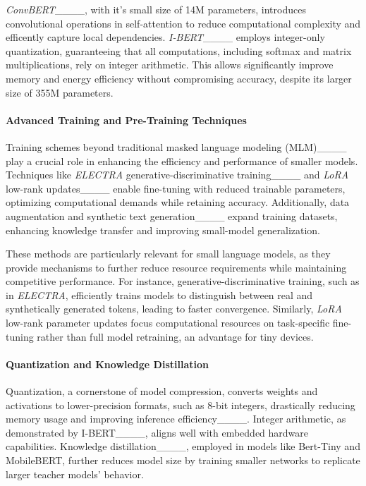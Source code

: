 \textit{ConvBERT}____, with it's small size of 14M parameters, introduces convolutional operations in self-attention to reduce computational complexity and efficently capture local dependencies. \textit{I-BERT}____ employs integer-only quantization, guaranteeing that all computations, including softmax and matrix multiplications, rely on integer arithmetic. This allows significantly improve memory and energy efficiency without compromising accuracy, despite its larger size of 355M parameters.

\paragraph{Advanced Training and Pre-Training Techniques}
Training schemes beyond traditional masked language modeling (MLM)____ play a crucial role in enhancing the efficiency and performance of smaller models. Techniques like \textit{ELECTRA} generative-discriminative training____ and \textit{LoRA} low-rank updates____ enable fine-tuning with reduced trainable parameters, optimizing computational demands while retaining accuracy. Additionally, data augmentation and synthetic text generation____ expand training datasets, enhancing knowledge transfer and improving small-model generalization.

These methods are particularly relevant for small language models, as they provide mechanisms to further reduce resource requirements while maintaining competitive performance. For instance, generative-discriminative training, such as in \textit{ELECTRA}, efficiently trains models to distinguish between real and synthetically generated tokens, leading to faster convergence. Similarly, \textit{LoRA} low-rank parameter updates focus computational resources on task-specific fine-tuning rather than full model retraining, an advantage for tiny devices.


\paragraph{Quantization and Knowledge Distillation}
Quantization, a cornerstone of model compression, converts weights and activations to lower-precision formats, such as 8-bit integers, drastically reducing memory usage and improving inference efficiency____. Integer arithmetic, as demonstrated by I-BERT____, aligns well with embedded hardware capabilities. Knowledge distillation____, employed in models like Bert-Tiny and MobileBERT, further reduces model size by training smaller networks to replicate larger teacher models' behavior.

